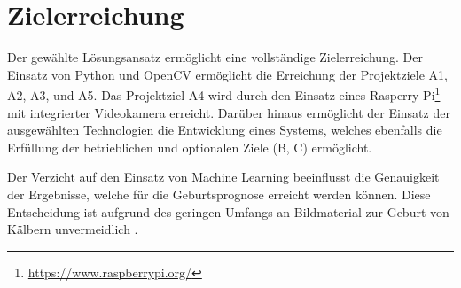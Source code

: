 \section{Zielerreichung}

Der gewählte Lösungsansatz ermöglicht eine vollständige Zielerreichung. Der Einsatz von Python und OpenCV ermöglicht die Erreichung der Projektziele A1, A2, A3, und A5. Das Projektziel A4 wird durch den Einsatz eines Rasperry Pi\footnote{\url{https://www.raspberrypi.org/}} mit integrierter Videokamera erreicht. Darüber hinaus ermöglicht der Einsatz der ausgewählten Technologien die Entwicklung eines Systems, welches ebenfalls die Erfüllung der betrieblichen und optionalen Ziele (B, C) ermöglicht.

Der Verzicht auf den Einsatz von Machine Learning beeinflusst die Genauigkeit der Ergebnisse, welche für die Geburtsprognose erreicht werden können. Diese Entscheidung ist aufgrund des geringen Umfangs an Bildmaterial zur Geburt von Kälbern unvermeidlich .


